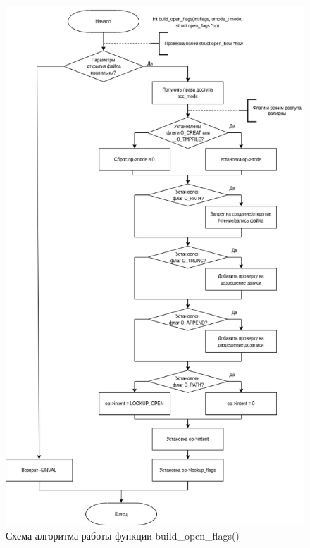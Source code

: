 \begin{figure}[H]
	\centering
	\includegraphics[scale=0.6]{assets/open-build_open_flags.drawio.png}
	\caption{Схема алгоритма работы функции build\_open\_flags()}
\end{figure}

